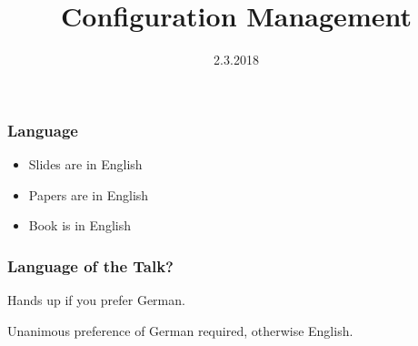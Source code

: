 \documentclass{beamer}
\title[Configuration Management \hspace{25mm} \insertframenumber/\inserttotalframenumber]{Configuration Management}
\institute{Institute of Information Systems Engineering, TU Wien}
\date{2.3.2018}
\begin{document}
\renewcommand{\enquote}[1]{\emph{``#1''}} %

\begin{frame}
	\titlepage
	\doclicenseThis
\end{frame}

\begin{frame}
	\frametitle{Language}
	\begin{itemize}
		\item Slides are in English
		\item Papers are in English
		\item Book is in English
	\end{itemize}
\end{frame}

\begin{assignment}
	\frametitle{Language of the Talk?}
	\begin{task}
	Hands up if you prefer German.
	\end{task}
	Unanimous preference of German required, otherwise English.
\end{assignment}

\end{document}
